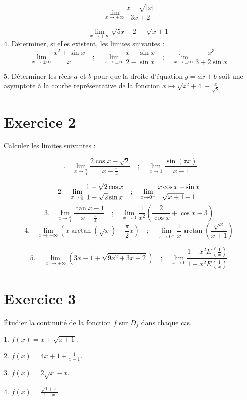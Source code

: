 \documentclass[12pt]{article}
\begin{document}
\[
\lim_{x \to \pm \infty} \frac{x - \sqrt{|x|}}{3x + 2}
\]

\[
\lim_{x \to +\infty} \sqrt{5x-2}-\sqrt{x+1}
\]
4. Déterminer, si elles existent, les limites suivantes :
\[
\lim_{x \to \pm \infty} \frac{x^2 + \sin x}{x} \quad ; \quad \lim_{x \to \pm\infty} \frac{x + \sin x}{2 - \sin x} \quad ; \quad \lim_{x \to \pm \infty} \frac{x^3}{3 + 2 \sin x}
\]

5. Déterminer les réels \( a \) et \( b \) pour que la droite d'équation \( y = ax + b \) soit une asymptote à la courbe représentative de la fonction \( x \mapsto \sqrt{x^2 + 4} - \frac{x}{\sqrt{2}} \).

\section*{Exercice 2}

Calculer les limites suivantes :

\[
1. \quad \lim_{x \to \frac{\pi}{4}} \frac{2 \cos x - \sqrt{2}}{x - \frac{\pi}{4}} \quad ; \quad \lim_{x \to 1} \frac{\sin(\pi x)}{x - 1}
\]

\[
2. \quad \lim_{x \to \frac{\pi}{4}} \frac{1 - \sqrt{2} \cos x}{1 - \sqrt{2} \sin x} \quad ; \quad \lim_{x \to 0^+} \frac{x \cos x + \sin x}{\sqrt{x + 1} - 1} \\
\]
\[
3. \quad \lim_{x \to \frac{\pi}{4}} \frac{\tan x - 1}{x - \frac{\pi}{4}} \quad ; \quad \lim_{x \to 0} \frac{1}{x^2} \left( \frac{2}{\cos x }+ \cos x - 3 \right)
\]
\[
4. \quad \lim_{x \to +\infty} \left( x \arctan (\sqrt{x}) - \frac{\pi}{2} x \right) \quad ; \quad \lim_{x \to 0^+} \frac{1}{x} \arctan \left( \frac{\sqrt{x}}{x + 1} \right)
\]

\[
5. \quad \lim_{|x| \to +\infty} \left( 3x - 1 + \sqrt{9x^2 + 3x - 2} \right) \quad ; \quad \lim_{x \to 0} \frac{1 - x^2 E \left( \frac{1}{x} \right)}{1 + x^2 E \left( \frac{1}{x} \right)} 
\]

\section*{Exercice 3}

Étudier la continuité de la fonction $f$ sur $D_f$ dans chaque cas.

1. $f(x) = x + \sqrt{x+1}$.

2. $f(x) = 4x + 1 + \frac{1}{x - 1}$.

3. $f(x) = 2\sqrt{x} - x$.

4. $f(x) = \frac{\sqrt{1 + x}}{1 - x}$.
\end{document}
